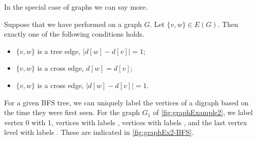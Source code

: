 %
%

In the special case of graphs we can say more.

\begin{Theorem}
\label{thm:BFS-grapharcclass}
Suppose that we have performed  on a graph $G$. Let $\{v,
w\}\in E(G)$. Then exactly one of the following conditions holds.

\begin{itemize}
\item
$\{v, w\}$ is a tree edge, $| d[w] - d[v] |= 1$;
\item
$\{v, w\}$ is a cross edge, $d[w] = d[v]$;
\item
$\{v, w\}$ is a cross edge, $| d[w] - d[v] | = 1$.
\end{itemize}
\end{Theorem}


For a given BFS tree, we can uniquely label the vertices of
a digraph based on the time they were first seen. For the graph
$G_1$ of \cref{fig:graphExample2}, we label vertex 0 with 1,
vertices  with labels , vertices  with
labels , and the last vertex level  with labels
. These are indicated in \cref{fig:graphEx2-BFS}.

